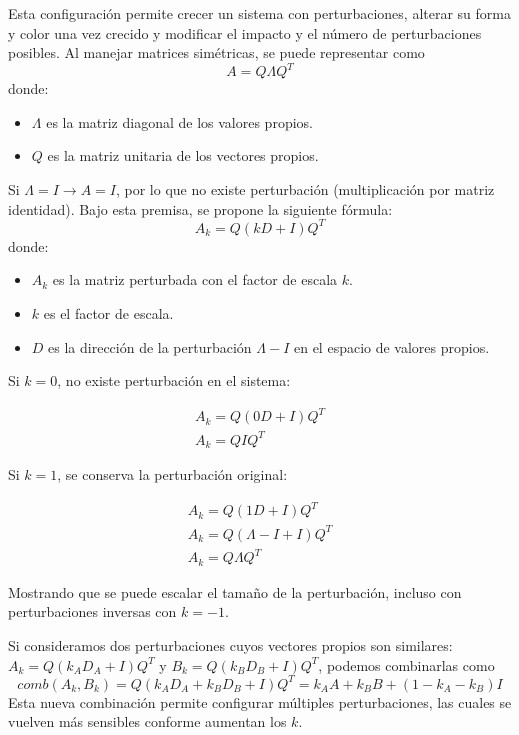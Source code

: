 Esta configuración permite crecer un sistema con perturbaciones, alterar su forma y color una vez crecido y modificar el impacto y el número de perturbaciones posibles. Al manejar matrices simétricas, se puede representar como 
\[A = Q \Lambda Q^T\] 
donde: 

\begin{itemize}
	
	\item $\Lambda$ es la matriz diagonal de los valores propios.
	
	\item $Q$ es la matriz unitaria de los vectores propios.
	
\end{itemize} 

Si $\Lambda = I \to A = I$, por lo que no existe perturbación (multiplicación por matriz identidad). Bajo esta premisa, se propone la siguiente fórmula:
\[ A_k = Q(kD + I)Q^T\]
donde:

\begin{itemize}
	
	\item $A_k$ es la matriz perturbada con el factor de escala $k$.
	
	\item $k$ es el factor de escala.
	
	\item $D$ es la dirección de la perturbación $\Lambda - I$ en el espacio de valores propios. 
	
\end{itemize}

Si $k = 0$, no existe perturbación en el sistema:

\begin{gather*}
	A_k = Q(0D + I)Q^T \\
	A_k = Q I Q^T
\end{gather*}

Si $k = 1$, se conserva la perturbación original:

\begin{gather*}
	A_k = Q(1D + I)Q^T \\
	A_k = Q(\Lambda - I + I)Q^T \\
	A_k = Q \Lambda Q^T
\end{gather*}

Mostrando que se puede escalar el tamaño de la perturbación, incluso con perturbaciones inversas con $k = -1$.

Si consideramos dos perturbaciones cuyos vectores propios son similares: $A_k = Q(k_AD_A + I)Q^T$ y $B_k = Q(k_B D_B + I)Q^T$, podemos combinarlas como
\[ comb(A_k, B_k) = Q (k_A D_A + k_B D_B + I) Q^T = k_A A + k_B B + (1 - k_A - k_B) I \]
Esta nueva combinación permite configurar múltiples perturbaciones, las cuales se vuelven más sensibles conforme aumentan los $k$.

